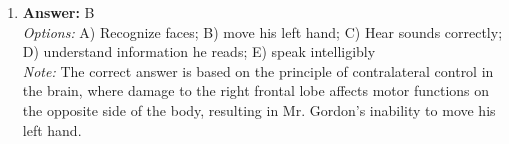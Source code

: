 \documentclass[12pt]{article}
\begin{document}
\begin{enumerate}[label=\arabic*.]
\\ \textit{Note:} The recovery rate in individuals using self-help resources serves as a proper comparison rate because it provides a baseline for evaluating the effectiveness of the new psychotherapy against an established method of treatment that emphasizes self-directed healing.
\item \textbf{Answer:} B
\\ \textit{Options:} A) Recognize faces; B) move his left hand; C) Hear sounds correctly; D) understand information he reads; E) speak intelligibly
\\ \textit{Note:} The correct answer is based on the principle of contralateral control in the brain, where damage to the right frontal lobe affects motor functions on the opposite side of the body, resulting in Mr. Gordon's inability to move his left hand.
\end{enumerate}
\end{document}
